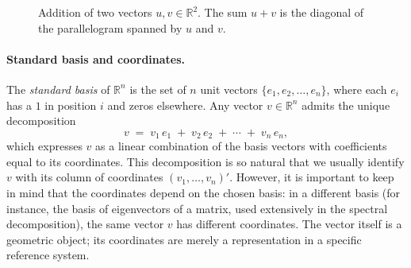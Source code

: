 \documentclass[11pt, a4paper, oneside]{article}
\begin{document}
\begin{figure}[H]
\centering
{}
\caption{Addition of two vectors $u, v \in \mathbb{R}^2$. The sum
$u + v$ is the diagonal of the parallelogram spanned by $u$ and $v$.}
\label{fig:vector-addition}
\end{figure}

\paragraph{Standard basis and coordinates.}
The \emph{standard basis} of $\mathbb{R}^n$ is the set of $n$ unit
vectors $\{e_1, e_2, \ldots, e_n\}$, where each $e_i$ has a $1$ in
position $i$ and zeros elsewhere. Any vector $v \in \mathbb{R}^n$
admits the unique decomposition
\[
v \;=\; v_1\, e_1 \;+\; v_2\, e_2 \;+\; \cdots \;+\; v_n\, e_n,
\]
which expresses $v$ as a linear combination of the basis vectors with
coefficients equal to its coordinates. This decomposition is so
natural that we usually identify $v$ with its column of coordinates
$(v_1, \ldots, v_n)'$. However, it is important to keep in mind that
the coordinates depend on the chosen basis: in a different basis (for
instance, the basis of eigenvectors of a matrix, used extensively in
the spectral decomposition), the same vector $v$ has different
coordinates. The vector itself is a geometric object; its
coordinates are merely a representation in a specific reference
system.
\end{document}

